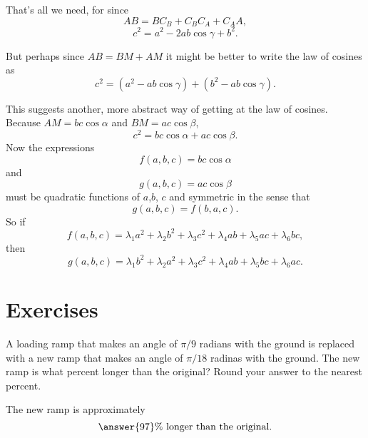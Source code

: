 \documentclass{ximera}
\begin{document}
\begin{exploration}
That's all we need, for since
\[
    AB = BC_B + C_B C_A + C_AA ,
\]
\[
  c^2 = a^2 - 2ab \cos \gamma + b^2 .
\]

But perhaps since $AB = BM +AM$ it might be better to write the law of cosines as
\[
   c^2 = (a^2 -ab\cos\gamma) + (b^2- ab\cos \gamma) .
\]

This suggests another, more abstract way of getting at the law of cosines. Because $AM = bc \cos \alpha$ and $BM = ac \cos\beta$,
\[
   c^2 = bc \cos \alpha + ac \cos \beta .
\]
Now the expressions 
\[
   f(a,b,c) = bc \cos\alpha
\]
and
\[
   g(a,b,c) = ac \cos \beta
\]
must be quadratic functions of $a$,$b$, $c$ and symmetric in the sense that
\[
  g(a,b,c) = f(b,a,c) .
\]
So if
\[
  f(a,b,c) = \lambda_1 a^2 + \lambda_2 b^2 + \lambda_3 c^2 + \lambda_4 ab + \lambda_5 ac + \lambda_6 bc ,
\]
then
\[
  g(a,b,c) = \lambda_1 b^2 + \lambda_2 a^2 + \lambda_3 c^2 + \lambda_4 ab + \lambda_5 bc + \lambda_6 ac  .
\]

\end{exploration}







\section{Exercises}

\begin{question} \label{Q0:SineCosine}
A loading ramp that makes an angle of $\pi/9$ radians with the ground is replaced with a new ramp that makes an angle of $\pi/18$ radinas with the ground. The new ramp is what percent longer than the original? Round your answer to the nearest percent.

The new ramp is approximately 
\[
   \answer{97}\% \text{ longer than the original.}
\]


\end{question}
\end{document}
